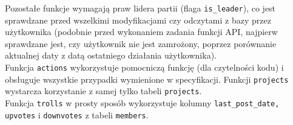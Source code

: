 \documentclass[a4paper,10pt]{article}
\begin{document}
\indent Pozostałe funkcje wymagają praw lidera partii (flaga \texttt{is\_leader}), co jest sprawdzane przed wszelkimi modyfikacjami czy odczytami z bazy przez użytkownika (podobnie przed wykonaniem zadania funkcji API, najpierw sprawdzane jest, czy użytkownik nie jest zamrożony, poprzez porównanie aktualnej daty z datą ostatniego działania użytkownika). \\
\indent Funkcja \texttt{actions} wykorzystuje pomocniczą funkcję (dla czytelności kodu) i obsługuje wszystkie przypadki wymienione w specyfikacji.
Funkcji \texttt{projects} wystarcza korzystanie z samej tylko tabeli \texttt{projects}. \\
\indent Funkcja \texttt{trolls} w prosty sposób wykorzystuje kolumny \texttt{last\_post\_date, upvotes} i \texttt{downvotes} z tabeli \texttt{members}.
\end{document}

